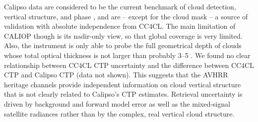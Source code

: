 Calipso data are considered to be the current benchmark of cloud detection, vertical structure, and phase \citep{Winker09,Karlsson13}, and are -- except for the cloud mask -- a source of validation with absolute independence from CC4CL. The main limitation of CALIOP though is its nadir-only view, so that global coverage is very limited. Also, the instrument is only able to probe the full geometrical depth of clouds whose total optical thickness is not larger than probably 3--5 \citep{Karlsson13}. We found no clear relationship between CC4CL CTP uncertainty and the difference between CC4CL CTP and Calipso CTP (data not shown). This suggests that the AVHRR heritage channels provide independent information on cloud vertical structure that is not clearly related to Calipso's CTP estimates. Retrieval uncertainty is driven by background and forward model error as well as the mixed-signal satellite radiances rather than by the complex, real vertical cloud structure.



